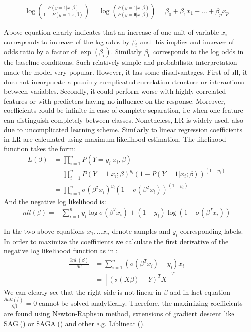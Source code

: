 \documentclass[shortabstract, english, mgr]{iithesis}
\begin{document}
\begin{align*}
    \log \left(\frac{P(y=1| x, \beta)}{1-P(y=1| x, \beta)}\right)=\log \left(\frac{P(y=1| x, \beta)}{P(y=0| x, \beta)}\right)=\beta_{0}+\beta_{1} x_{1}+\ldots+\beta_{p} x_{p}
\end{align*}

Above equation clearly indicates that an increase of one unit of variable $x_i$ corresponds to increase of the log odds by $\beta_i$ and this implies and increase of odds ratio by a factor of $\exp(\beta_i)$. Similarly $\beta_0$ corresponds to the log odds in the baseline conditions. Such relatively simple and probabilistic interpretation made the model very popular. However, it has some disadvantages. First of all, it does not incorporate a possibly complicated correlation structure or interactions between variables. Secondly, it could perform worse with highly correlated features or with predictors having no influence on the response. Moreover, coefficients could be infinite in case of complete separation, i.e when one feature can distinguish completely between classes. Nonetheless, LR is widely used, also due to uncomplicated learning scheme. Similarly to linear regression coefficients in LR are calculated using maximum likelihood estimation. The likelihood function takes the form:
\begin{align*}
    L(\beta) &= \prod_{i=1}^n P(Y=y_i | x_i, \beta) \\&= \prod_{i=1}^n P(Y=1 | x_i ; \beta)^{y_i}(1-P(Y=1 | x_i ; \beta))^{\left(1-y_i\right)} \\
&= \prod_{i=1}^n \sigma\left(\beta^{T} x_i\right)^{y_i}\left(1-\sigma\left(\beta^{T} x_i\right)\right)^{\left(1-y_i\right)}
\end{align*}
And the negative log likelihood is:
\begin{align*}
    nll(\beta)=-\sum_{i=1}^{n} y_i \log \sigma\left(\beta^{T} x_i\right)+\left(1-y_i\right) \log \left(1-\sigma\left(\beta^{T} x_i\right)\right)
\end{align*}

In the two above equations $x_1, \ldots x_n$ denote samples and $y_i$ corresponding labels. In order to maximize the coefficients we calculate the first derivative of the negative log likelihood function as in \cite[chapter 4.4.1]{ESL2}:
\begin{align*}
    \frac{\partial nll(\beta)}{\partial \beta}&=\sum_{i=1}^{n}\left(\sigma\left(\beta^{T} x_i\right)-y_i\right) x_i\\ &=
    \left[\left(\sigma(X\beta) - Y\right)^TX\right]^T
\end{align*}
We can clearly see that the right side is not linear in $\beta$ and in fact equation $\frac{\partial nll(\beta)}{\partial \beta} = 0$ cannot be solved analytically. Therefore, the maximizing coefficients are found using Newton-Raphson method, extensions of gradient descent like SAG (\cite{sag}) or SAGA (\cite{saga}) and other e.g. Liblinear (\cite{liblinear}). 
\end{document}
